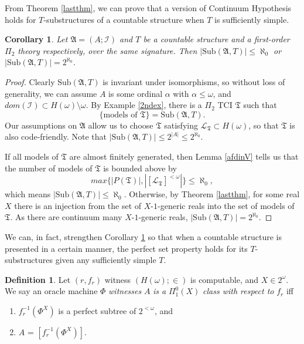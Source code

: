 \documentclass[12pt, twoside]{memoir}
\numberwithin{equation}{section}
\newtheorem{cor}[thm]{Corollary}
\theoremstyle{definition}
\newtheorem{defi}[thm]{Definition}
\theoremstyle{remark}
\theoremstyle{definition}
\theoremstyle{definition}
\theoremstyle{definition}
\theoremstyle{remark}
\begin{document}
From Theorem \ref{lastthm}, we can prove that a version of Continuum Hypothesis holds for $T$-substructures of a countable structure when $T$ is sufficiently simple.

\begin{cor}\label{lastcor}
Let $\mathfrak{A} = (A; \mathcal{I})$ and $T$ be a countable structure and a first-order $\Pi_2$ theory respectively, over the same signature. Then $|\mathrm{Sub}(\mathfrak{A}, T)| \leq \aleph_0$ or $|\mathrm{Sub}(\mathfrak{A}, T)| = 2^{\aleph_0}$.
\end{cor}

\begin{proof}
Clearly $\mathrm{Sub}(\mathfrak{A}, T)$ is invariant under isomorphisms, so without loss of generality, we can assume $A$ is some ordinal $\alpha$ with $\alpha \leq \omega$, and $dom(\mathcal{I}) \subset H(\omega) \setminus \omega$. By Example \ref{2ndex}, there is a $\Pi_2$ TCI $\mathfrak{T}$ such that $$\{ \text{models of } \mathfrak{T}\} = \mathrm{Sub}(\mathfrak{A}, T).$$ Our assumptions on $\mathfrak{A}$ allow us to choose $\mathfrak{T}$ satisfying $\mathcal{L}_{\mathfrak{T}} \subset H(\omega)$, so that $\mathfrak{T}$ is also code-friendly. Note that $|\mathrm{Sub}(\mathfrak{A}, T)| \leq 2^{|A|} \leq 2^{\aleph_0}$.

If all models of $\mathfrak{T}$ are almost finitely generated, then Lemma \ref{afdinV} tells us that the number of models of $\mathfrak{T}$ is bounded above by $$max\{|P(\mathfrak{T})|, |[\mathcal{L}_{\mathfrak{T}}]^{< \omega}|\} \leq \aleph_0,$$ which means $|\mathrm{Sub}(\mathfrak{A}, T)| \leq \aleph_0$. Otherwise, by Theorem \ref{lastthm}, for some real $X$ there is an injection from the set of $X$-$1$-generic reals into the set of models of $\mathfrak{T}$. As there are continuum many $X$-$1$-generic reals, $|\mathrm{Sub}(\mathfrak{A}, T)| = 2^{\aleph_0}$.
\end{proof}

We can, in fact, strengthen Corollary \ref{lastcor} so that when a countable structure is presented in a certain manner, the perfect set property holds for its $T$-substructures given any sufficiently simple $T$. 

\begin{defi}
Let $(r, f_r)$ witness $(H(\omega); \in)$ is computable, and $X \in 2^{\omega}$. We say an oracle machine $\Phi$ \emph{witnesses} $A$ \emph{is a} $\Pi^0_1(X)$ \emph{class with respect to} $f_r$ iff 
\begin{enumerate}[label=(\arabic*)] 
    \item $f_r^{-1}(\Phi^X)$ is a perfect subtree of $2^{<\omega}$, and
    \item $A$ = $[f_r^{-1}(\Phi^X)]$.
\end{enumerate} 
\end{defi}
\end{document}

